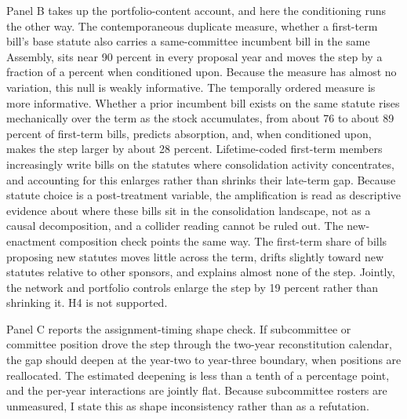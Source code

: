 \documentclass[11pt]{article}
\begin{document}
Panel B takes up the portfolio-content account, and here the conditioning runs the other way. The contemporaneous duplicate measure, whether a first-term bill's base statute also carries a same-committee incumbent bill in the same Assembly, sits near 90 percent in every proposal year and moves the step by a fraction of a percent when conditioned upon. Because the measure has almost no variation, this null is weakly informative. The temporally ordered measure is more informative. Whether a prior incumbent bill exists on the same statute rises mechanically over the term as the stock accumulates, from about 76 to about 89 percent of first-term bills, predicts absorption, and, when conditioned upon, makes the step larger by about 28 percent. Lifetime-coded first-term members increasingly write bills on the statutes where consolidation activity concentrates, and accounting for this enlarges rather than shrinks their late-term gap. Because statute choice is a post-treatment variable, the amplification is read as descriptive evidence about where these bills sit in the consolidation landscape, not as a causal decomposition, and a collider reading cannot be ruled out. The new-enactment composition check points the same way. The first-term share of bills proposing new statutes moves little across the term, drifts slightly toward new statutes relative to other sponsors, and explains almost none of the step. Jointly, the network and portfolio controls enlarge the step by 19 percent rather than shrinking it. H4 is not supported.

Panel C reports the assignment-timing shape check. If subcommittee or committee position drove the step through the two-year reconstitution calendar, the gap should deepen at the year-two to year-three boundary, when positions are reallocated. The estimated deepening is less than a tenth of a percentage point, and the per-year interactions are jointly flat. Because subcommittee rosters are unmeasured, I state this as shape inconsistency rather than as a refutation.
\end{document}
